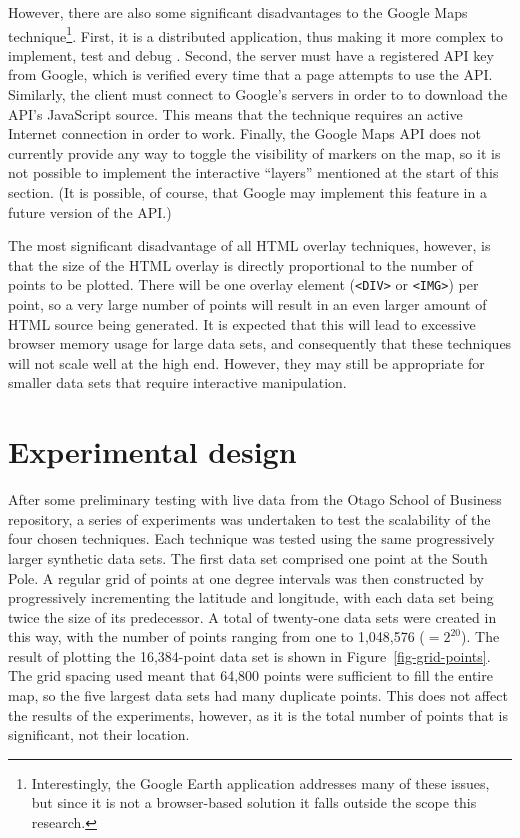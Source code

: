 \documentclass[acmnow]{acmtrans2m}
\begin{document}
However, there are also some significant disadvantages to the Google
Maps technique\footnote{Interestingly, the Google Earth application
addresses many of these issues, but since it is not a browser-based
solution it falls outside the scope this research.}. First, it is a
distributed application, thus making it more complex to implement, test
and debug \cite{Bates-PC-1995-distdebug,Ensl-PH-1978-distributed}.
Second, the server must have a registered API key from Google, which is
verified every time that a page attempts to use the API. Similarly, the
client must connect to Google's servers in order to to download the
API's JavaScript source. This means that the technique requires an
active Internet connection in order to work. Finally, the Google Maps
API does not currently provide any way to toggle the visibility of
markers on the map, so it is not possible to implement the interactive
``layers'' mentioned at the start of this section. (It is possible, of
course, that Google may implement this feature in a future version of
the API.)

The most significant disadvantage of all HTML overlay techniques,
however, is that the size of the HTML overlay is directly proportional
to the number of points to be plotted. There will be one overlay element
(\verb|<DIV>| or \verb|<IMG>|) per point, so a very large number of
points will result in an even larger amount of HTML source being
generated. It is expected that this will lead to excessive browser
memory usage for large data sets, and consequently that these techniques
will not scale well at the high end. However, they may still be
appropriate for smaller data sets that require interactive manipulation.


\section{Experimental design}
\label{sec-experiment}

After some preliminary testing with live data from the Otago School of
Business repository, a series of experiments was undertaken to test the
scalability of the four chosen techniques. Each technique was tested
using the same progressively larger synthetic data sets. The first data
set comprised one point at the South Pole. A regular grid of points at
one degree intervals was then constructed by progressively incrementing
the latitude and longitude, with each data set being twice the size of
its predecessor. A total of twenty-one data sets were created in this
way, with the number of points ranging from one to 1,048,576
(\(=2^{20}\)). The result of plotting the 16,384-point data set is shown
in Figure~\ref{fig-grid-points}. The grid spacing used meant that 64,800
points were sufficient to fill the entire map, so the five largest data
sets had many duplicate points. This does not affect the results of the
experiments, however, as it is the total number of points that is
significant, not their location.
\end{document}
